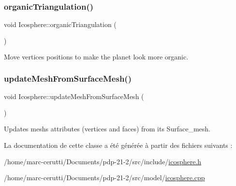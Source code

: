 \mbox{\label{class_icosphere_ab3470de718fee359ef4691e0c2ee987a}} 
\subsubsection{\texorpdfstring{organic\+Triangulation()}{organicTriangulation()}}
{\footnotesize\ttfamily void Icosphere\+::organic\+Triangulation (\begin{DoxyParamCaption}{ }\end{DoxyParamCaption})}



Move vertices positions to make the planet look more organic. 

\mbox{\label{class_icosphere_a38645b095ea6895c2aa5bbff7d8edf20}} 
\subsubsection{\texorpdfstring{update\+Mesh\+From\+Surface\+Mesh()}{updateMeshFromSurfaceMesh()}}
{\footnotesize\ttfamily void Icosphere\+::update\+Mesh\+From\+Surface\+Mesh (\begin{DoxyParamCaption}{ }\end{DoxyParamCaption})}



Updates mesh\textquotesingle{}s attributes (vertices and faces) from its Surface\+\_\+mesh. 



La documentation de cette classe a été générée à partir des fichiers suivants \+:\begin{DoxyCompactItemize}
\item 
/home/marc-\/cerutti/\+Documents/pdp-\/21-\/2/src/include/\hyperlink{icosphere_8h}{icosphere.\+h}\item 
/home/marc-\/cerutti/\+Documents/pdp-\/21-\/2/src/model/\hyperlink{icosphere_8cpp}{icosphere.\+cpp}\end{DoxyCompactItemize}
